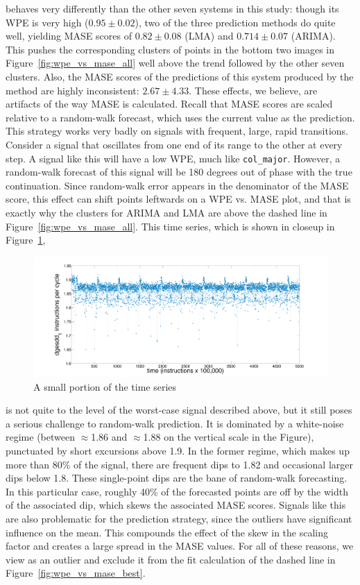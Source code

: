 \svdone behaves very differently than the other seven systems in this
study: though its WPE is very high ($0.95 \pm 0.02$), two of the three
prediction methods do quite well, yielding MASE scores of $0.82 \pm
0.08$ (LMA) and $0.714 \pm 0.07$ (ARIMA).  This pushes the
corresponding clusters of points in the bottom two images in
Figure~\ref{fig:wpe_vs_mase_all} well above the trend followed by the
other seven clusters.  Also, the MASE scores of the predictions of
this system produced by the \naive method are highly inconsistent:
$2.67 \pm 4.33$.  These effects, we believe, are artifacts of the way
MASE is calculated.  Recall that MASE scores are scaled relative to a
random-walk forecast, which uses the current value as the prediction.
This strategy works very badly on signals with frequent, large, rapid
transitions.  Consider a signal that oscillates from one end of its
range to the other at every step.  A signal like this will have a low
WPE, much like {\tt col\_major}.  However, a random-walk forecast of
this signal will be 180 degrees out of phase with the true
continuation.  Since random-walk error appears in the denominator of
the MASE score, this effect can shift points leftwards on a WPE
vs. MASE plot, and that is exactly why the \svdone clusters for ARIMA
and LMA are above the dashed line in Figure~\ref{fig:wpe_vs_mase_all}.
This time series, which is shown in closeup in
Figure~\ref{fig:svdone-ts},
\begin{figure}[htbp]
  \centering
    \includegraphics[width=\textwidth]{figs/svdonets2}
\caption{A small portion of the \svdone time series}\label{fig:svdone-ts}
\end{figure} 
is not quite to the level of the worst-case signal described above,
but it still poses a serious challenge to random-walk prediction.  It
is dominated by a white-noise regime (between $\approx$1.86 and
$\approx$1.88 on the vertical scale in the Figure), punctuated by
short excursions above 1.9.  In the former regime, which makes up more
than 80\% of the signal, there are frequent dips to 1.82 and
occasional larger dips below 1.8.  These single-point dips are the
bane of random-walk forecasting.  In this particular case, roughly
40\% of the forecasted points are off by the width of the associated
dip, which skews the associated MASE scores.  Signals like this are
also problematic for the \naive prediction strategy, since the
outliers have significant influence on the mean.  This compounds the
effect of the skew in the scaling factor and creates a large spread in
the \svdone MASE values.  For all of these reasons, we view \svdone as
an outlier and exclude it from the fit calculation of the dashed line
in Figure~\ref{fig:wpe_vs_mase_best}.

